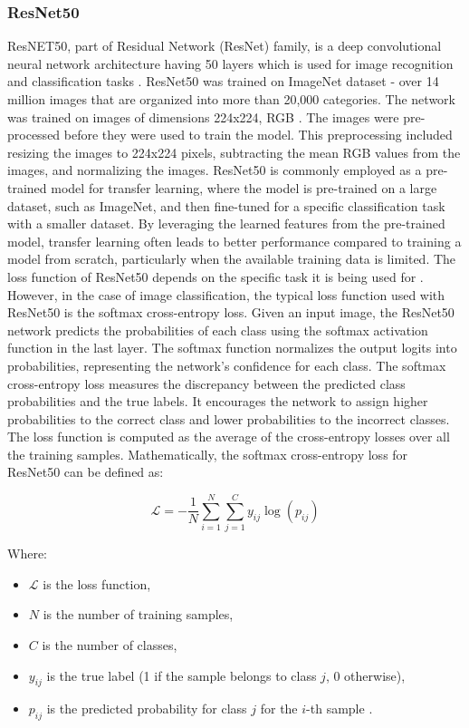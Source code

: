 \documentclass[12pt,a4paper]{article}
\begin{document}
\subsubsection{ResNet50}
ResNET50, part of Residual Network (ResNet) family, is a deep convolutional neural network architecture having 50 layers which is used for image recognition and classification tasks \cite{DBLP:journals/corr/HeZRS15}. ResNet50 was trained on ImageNet dataset - over 14 million images that are organized into more than 20,000 categories. The network was trained on images of dimensions 224x224, RGB \cite{DBLP:journals/corr/HeZRS15}. The images were pre-processed before they were used to train the model. This preprocessing included resizing the images to 224x224 pixels, subtracting the mean RGB values from the images, and normalizing the images. ResNet50 is commonly employed as a pre-trained model for transfer learning, where the model is pre-trained on a large dataset, such as ImageNet, and then fine-tuned for a specific classification task with a smaller dataset. By leveraging the learned features from the pre-trained model, transfer learning often leads to better performance compared to training a model from scratch, particularly when the available training data is limited. The loss function of ResNet50 depends on the specific task it is being used for \cite{DBLP:journals/corr/HeZRS15}. However, in the case of image classification, the typical loss function used with ResNet50 is the softmax cross-entropy loss. Given an input image, the ResNet50 network predicts the probabilities of each class using the softmax activation function in the last layer. The softmax function normalizes the output logits into probabilities, representing the network's confidence for each class. The softmax cross-entropy loss measures the discrepancy between the predicted class probabilities and the true labels. It encourages the network to assign higher probabilities to the correct class and lower probabilities to the incorrect classes. The loss function is computed as the average of the cross-entropy losses over all the training samples. Mathematically, the softmax cross-entropy loss for ResNet50 can be defined as:

\[
\mathcal{L} = -\frac{1}{N}\sum_{i=1}^{N}\sum_{j=1}^{C}y_{ij}\log(p_{ij})
\]

Where:
\begin{itemize}
\item $\mathcal{L}$ is the loss function,
\item $N$ is the number of training samples,
\item $C$ is the number of classes,
\item $y_{ij}$ is the true label (1 if the sample belongs to class $j$, 0 otherwise),
\item $p_{ij}$ is the predicted probability for class $j$ for the $i$-th sample \cite{DBLP:journals/corr/HeZRS15}.
\end{itemize}
\end{document}
